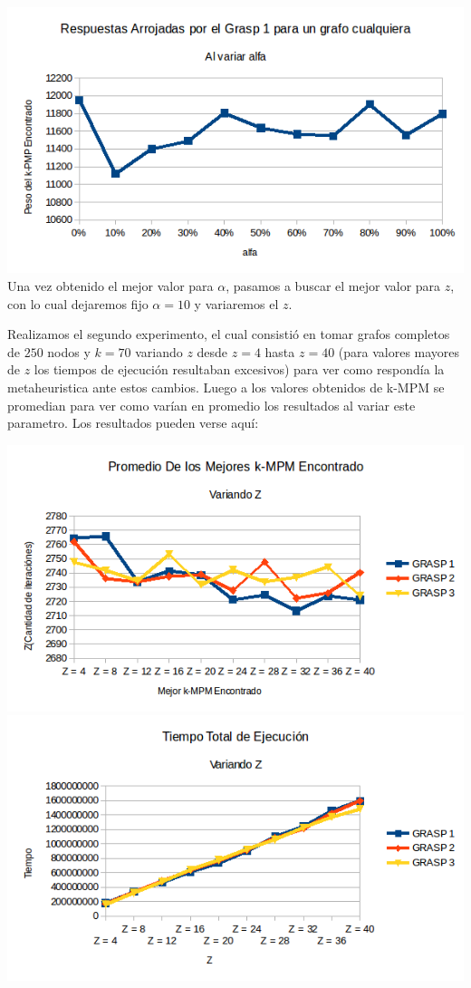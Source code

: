 \includegraphics[scale=0.7]{Ej5/ejemploAlfa.png}\\


Una vez obtenido el mejor valor para $\alpha$, pasamos a buscar el mejor valor para $z$, con lo cual dejaremos fijo $\alpha=10$ y variaremos el $z$.

Realizamos el segundo experimento, el cual consistió en tomar grafos completos de $250$ nodos y $k = 70$ variando $z$ desde $z = 4$ hasta $z = 40$ (para valores mayores de $z$ los tiempos de ejecución resultaban excesivos) para ver como respondía la metaheuristica ante estos cambios. Luego a los valores obtenidos de k-MPM se promedian para ver como varían en promedio los resultados al variar este parametro.
Los resultados pueden verse aquí:

\includegraphics[scale=0.7]{Ej5/promedioZ.png}\\

\includegraphics[scale=0.7]{Ej5/tiemposZ.png}\\

